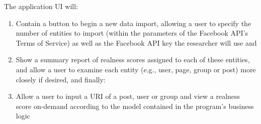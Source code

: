 \documentclass{article}
\begin{document}
The application UI will:
\begin{enumerate}
\item Contain a button to begin a new data import, allowing a user to specify the number of entities to import (within the parameters of the Facebook API's Terms of Service) as well as the Facebook API key the researcher will use and
\item Show a summary report of realness scores assigned to each of these entities, and allow a user to examine each entity (e.g., user, page, group or post) more closely if desired, and finally:
\item Allow a user to input a URI of a post, user or group and view a realness score on-demand according to the model contained in the program's business logic
\end{enumerate}




\end{document}
